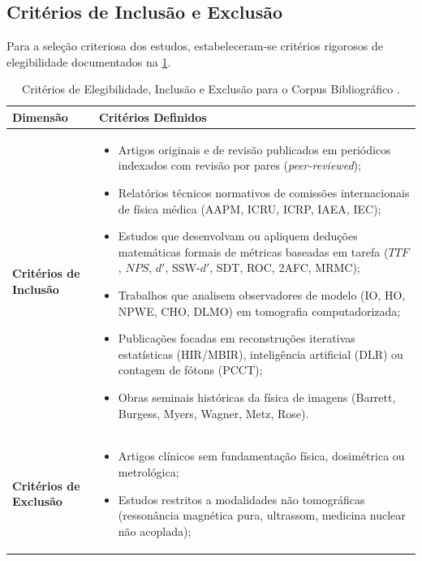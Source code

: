 \documentclass[
  12pt,
  a4paper,
  oneside
]{report}
\begin{document}
\subsection{Critérios de Inclusão e Exclusão}
\label{subsec:criterios_elegibilidade_detalhe}
Para a seleção criteriosa dos estudos, estabeleceram-se critérios rigorosos de elegibilidade documentados na \cref{tab:criterios_inclusao_exclusao}.

\begin{table}[htbp]
  \centering
  \small
  \caption[Critérios de Elegibilidade da Revisão]{Critérios de Elegibilidade, Inclusão e Exclusão para o Corpus Bibliográfico \cite{page2021, aapm_tg233_2019, icru54_1996}.}
  \label{tab:criterios_inclusao_exclusao}
  \renewcommand{\arraystretch}{1.25}
  \begin{tabularx}{\textwidth}{>{\RaggedRight\bfseries}p{} >{\RaggedRight\arraybackslash}X}
    \toprule
    \textbf{Dimensão} & \textbf{Critérios Definidos} \\
    \midrule
    Critérios de Inclusão & 
    \begin{itemize}[leftmargin=*,noitemsep,topsep=0pt]
      \item Artigos originais e de revisão publicados em periódicos indexados com revisão por pares (\emph{peer-reviewed});
      \item Relatórios técnicos normativos de comissões internacionais de física médica (AAPM, ICRU, ICRP, IAEA, IEC);
      \item Estudos que desenvolvam ou apliquem deduções matemáticas formais de métricas baseadas em tarefa ($TTF$, $NPS$, $d'$, SSW-$d'$, SDT, ROC, 2AFC, MRMC);
      \item Trabalhos que analisem observadores de modelo (IO, HO, NPWE, CHO, DLMO) em tomografia computadorizada;
      \item Publicações focadas em reconstruções iterativas estatísticas (HIR/MBIR), inteligência artificial (DLR) ou contagem de fótons (PCCT);
      \item Obras seminais históricas da física de imagens (Barrett, Burgess, Myers, Wagner, Metz, Rose).
    \end{itemize} \\
    \addlinespace[0.4em]
    Critérios de Exclusão & 
    \begin{itemize}[leftmargin=*,noitemsep,topsep=0pt]
      \item Artigos clínicos sem fundamentação física, dosimétrica ou metrológica;
      \item Estudos restritos a modalidades não tomográficas (ressonância magnética pura, ultrassom, medicina nuclear não acoplada);

\end{itemize}
\end{tabularx}
\end{table}
\end{document}
